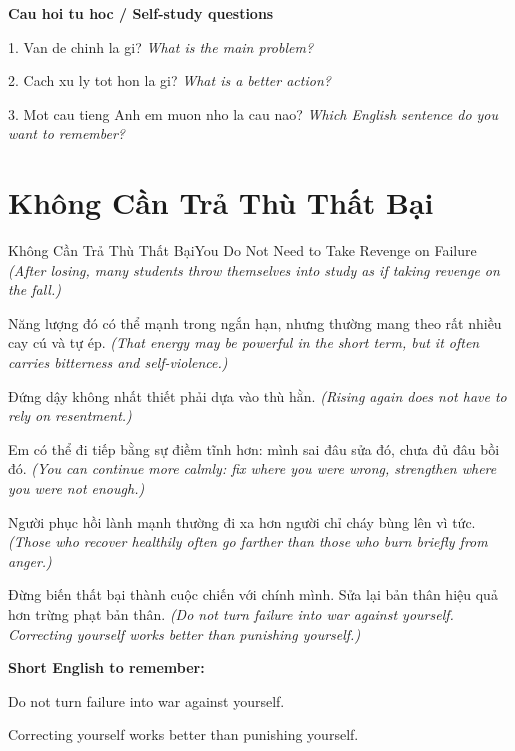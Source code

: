 \begin{tuhocnhanh}
\textbf{Cau hoi tu hoc / Self-study questions}

1. Van de chinh la gi? \textit{What is the main problem?}

2. Cach xu ly tot hon la gi? \textit{What is a better action?}

3. Mot cau tieng Anh em muon nho la cau nao? \textit{Which English sentence do you want to remember?}
\end{tuhocnhanh}
\ngancach

\section{Không Cần Trả Thù Thất Bại}
\begin{truyen}{Không Cần Trả Thù Thất Bại}{You Do Not Need to Take Revenge on Failure}
\textit{(After losing, many students throw themselves into study as if taking revenge on the fall.)}

Năng lượng đó có thể mạnh trong ngắn hạn, nhưng thường mang theo rất nhiều cay cú và tự ép.
\textit{(That energy may be powerful in the short term, but it often carries bitterness and self-violence.)}

Đứng dậy không nhất thiết phải dựa vào thù hằn.
\textit{(Rising again does not have to rely on resentment.)}

Em có thể đi tiếp bằng sự điềm tĩnh hơn: mình sai đâu sửa đó, chưa đủ đâu bồi đó.
\textit{(You can continue more calmly: fix where you were wrong, strengthen where you were not enough.)}

Người phục hồi lành mạnh thường đi xa hơn người chỉ cháy bùng lên vì tức.
\textit{(Those who recover healthily often go farther than those who burn briefly from anger.)}

\end{truyen}

\begin{baihoc}
Đừng biến thất bại thành cuộc chiến với chính mình. Sửa lại bản thân hiệu quả hơn trừng phạt bản thân.
\textit{(Do not turn failure into war against yourself. Correcting yourself works better than punishing yourself.)}
\end{baihoc}

\begin{ghinhoanh}
\textbf{Short English to remember:}

Do not turn failure into war against yourself.

Correcting yourself works better than punishing yourself.

\end{ghinhoanh}

